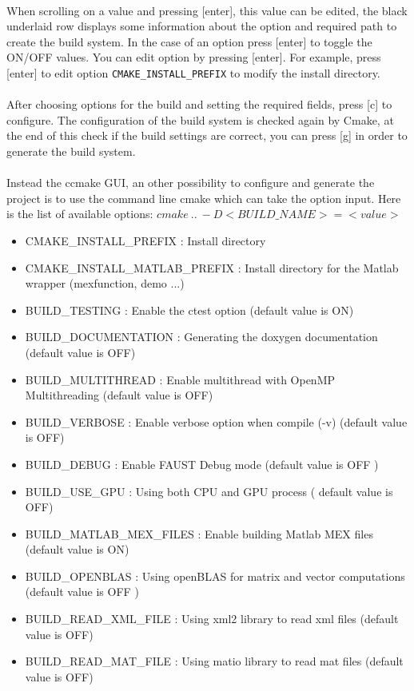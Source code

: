\paragraph{}When scrolling on a value and pressing [enter], this value can be edited, the black underlaid row displays some information about the option and required path to create the build system. In the case of an option press [enter] to toggle the ON/OFF values. You can edit option by pressing [enter]. For example, press [enter] to edit option \texttt{CMAKE\_INSTALL\_PREFIX} to modify the install directory. 
\paragraph{}After choosing options for the build and setting the required fields, press [c] to configure. The configuration of the build system is checked again by Cmake, at the end of this check if the build settings are correct, you can press [g] in order to generate the build system.

\paragraph{} Instead the ccmake GUI, an other possibility to configure and generate the project is to use the command line cmake which can take the option input. Here is the list of available options: 
\texttt{$cmake\ ..\ -D<BUILD\_NAME>=<value>$}

\begin{itemize}
\item CMAKE\_INSTALL\_PREFIX : Install directory
\item CMAKE\_INSTALL\_MATLAB\_PREFIX : Install directory for the Matlab wrapper (mexfunction, demo ...)
\item BUILD\_TESTING : Enable the ctest option (default value is ON)
\item BUILD\_DOCUMENTATION : Generating the doxygen documentation (default value is OFF)  
\item BUILD\_MULTITHREAD : Enable multithread with OpenMP Multithreading (default value is OFF)
\item BUILD\_VERBOSE : Enable verbose option when compile (-v) (default value is OFF)
\item BUILD\_DEBUG : Enable FAUST Debug mode (default value is OFF )
\item BUILD\_USE\_GPU : Using both CPU and GPU process ( default value is OFF)
\item BUILD\_MATLAB\_MEX\_FILES : Enable building Matlab MEX files (default value is ON)
\item BUILD\_OPENBLAS : Using openBLAS for matrix and vector computations (default value is OFF )
\item BUILD\_READ\_XML\_FILE : Using xml2 library to read xml files (default value is OFF)
\item BUILD\_READ\_MAT\_FILE : Using matio library to read mat files (default value is OFF)
\end{itemize}

